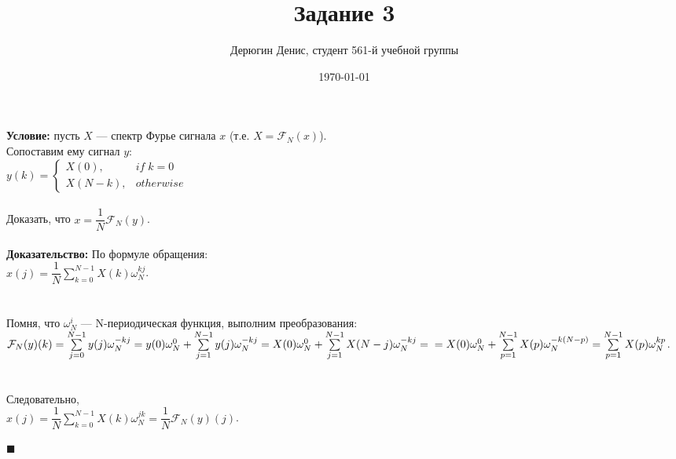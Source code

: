 \documentclass{article}
\title{Задание 3}
\author{
	Дерюгин Денис, студент 561-й учебной группы
}
\date{\today}
\newcommand\proofend{\begin{flushright}$\blacksquare$\end{flushright}}
\begin{document}
\maketitle
\large{
	\textbf{Условие:} пусть $X$ --- спектр Фурье сигнала $x$ (т.е. $X = \mathcal{F}_N(x)$).\\ Сопоставим ему сигнал $y$:\\
	
	$y(k) = \left\{\begin{matrix}
			X(0), & if\;k = 0 \\ 
			X(N - k), & otherwise 
		\end{matrix}\right.$\\
	\\

	Доказать, что $x = \dfrac{1}{N} \mathcal{F}_N(y)$.\\
	\\

	\textbf{Доказательство:} По формуле обращения:\\
	$x(j) = \dfrac{1}{N}\sum\limits_{k = 0}^{N-1} X(k)\omega_N^{kj}$.\\
	\\ \\
	Помня, что $\omega_N^i$ --- N-периодическая функция, выполним преобразования:\\
	$\mathcal{F}_N(y)(k) = \sum\limits_{j = 0}^{N - 1} y(j) \omega_N^{-kj} = y(0) \omega_N^0 + \sum\limits_{j = 1}^{N - 1} y(j) \omega_N^{-kj} = X(0) \omega_N^0 + \sum\limits_{j = 1}^{N - 1} X(N - j) \omega_N^{-kj} =\\ \\ \\= X(0) \omega_N^0 + \sum\limits_{p = 1}^{N - 1} X(p) \omega_N^{-k(N - p)} = \sum\limits_{p = 1}^{N - 1} X(p) \omega_N^{kp}$.\\ \\ \\
	Следовательно,\\
	$x(j) = \dfrac{1}{N}\sum\limits_{k = 0}^{N - 1} X(k) \omega_N^{jk} = \dfrac{1}{N} \mathcal{F}_N(y)(j)$.
	
	\proofend

}
\end{document}
